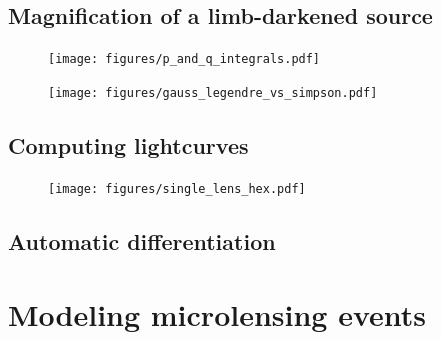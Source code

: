 \documentclass[12pt,dvipsnames]{report}
\begin{document}
\section{Magnification of a limb-darkened source}

\begin{figure}[t]
    \begin{centering}
        \texttt{[image: figures/p\_and\_q\_integrals.pdf]}
        \caption{}
        \label{fig:p_and_q_integrals}
    \end{centering}
\end{figure}

\begin{figure}[t]
    \begin{centering}
        \texttt{[image: figures/gauss\_legendre\_vs\_simpson.pdf]}
        \caption{}
        \label{fig:gauss_legendre_vs_simpson}
    \end{centering}
\end{figure}

\section{Computing lightcurves}
\begin{figure}[t]
    \begin{centering}
        \texttt{[image: figures/single\_lens\_hex.pdf]}
        \caption{}
        \label{fig:single_lens_hex}
    \end{centering}
\end{figure}

\section{Automatic differentiation}

\chapter{Modeling microlensing events}
\label{ch:microlensing_modeling}
\end{document}
